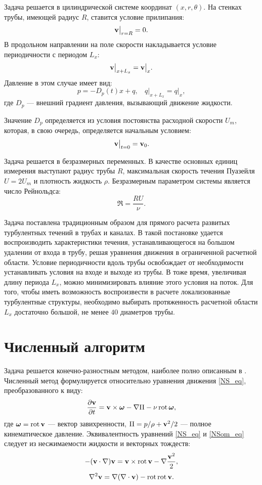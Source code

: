 Задача решается в цилиндрической системе координат $(x,r,\theta)$. На стенках трубы, имеющей радиус $R$, ставится условие прилипания:
\begin{equation} \label{bc1_eq}
\mathbf{v} \big|_{r=R} = 0.
\end{equation}
В продольном направлении на поле скорости накладывается условие периодичности с периодом $L_x$:
\begin{equation} \label{bc2_eq}
\mathbf{v} \big|_{x+L_x} = \mathbf{v} \big|_{x}.
\end{equation}
Давление в этом случае имеет вид:
$$
p = - D_p(t)x + q, \ \ \ \  q\big|_{x+L_x} = q\big|_{x},
$$
где $D_p$ --- внешний градиент давления, вызывающий движение жидкости. 

Значение $D_p$ определяется из условия постоянства расходной скорости $U_m$, которая, в свою очередь, определяется начальным условием:
$$
\mathbf{v}\big|_{t=0} = \mathbf{v}_0.
$$

 
Задача решается в безразмерных переменных. В качестве основных единиц измерения выступают радиус трубы $R$, максимальная скорость течения Пуазейля $U = 2U_m$ и плотность жидкость $\rho$. Безразмерным параметром системы является число Рейнольдса:
$$
\Re = \frac{R U}{\nu}. 
$$

Задача поставлена традиционным образом для прямого расчета развитых турбулентных течений в трубах и каналах. В такой постановке удается воспроизводить характеристики течения, устанавливающегося на большом удалении от входа в трубу, решая уравнения движения в ограниченной расчетной области. Условие периодичности вдоль трубы освобождает от необходимости устанавливать условия на входе и выходе из трубы. В тоже время, увеличивая длину периода $L_x$, можно минимизировать влияние этого условия на поток. Для того, чтобы иметь возможность воспроизвести в расчете локализованные турбулентные структуры, необходимо выбирать протяженность расчетной области $L_x$ достаточно большой, не менее $40$ диаметров трубы. 

\section{Численный алгоритм} \label{num_method}

Задача решается конечно-разностным методом, наиболее полно описанным в \cite{Nikitin2006}. Численный метод формулируется относительно уравнения движения \eqref{NS_eq}, преобразованного к	 виду:
\begin{equation}\label{NSom_eq}
\frac{\partial \mathbf{v}}{\partial t} =  \mathbf{v} \times \mbox{\boldmath$\omega$}  - \nabla \Pi - \nu \mathop{}\!\operatorname{rot} \mbox{\boldmath$\omega$},
\end{equation}
где $\mbox{\boldmath$\omega$} = \mathop{}\!\operatorname{rot} \mathbf{v}$ --- вектор завихренности, $\Pi = p/\rho + \mathbf{v}^2/2$ --- полное кинематическое давление. Эквивалентность уравнений \eqref{NS_eq} и \eqref{NSom_eq} следует из несжимаемости жидкости и векторных тождеств:
\begin{equation*}
-(\mathbf{v} \cdot \nabla) \mathbf{v} = \mathbf{v} \times \mathop{}\!\operatorname{rot} \mathbf{v} - \nabla \frac{\mathbf{v}^2}{2},
\end{equation*}
\begin{equation*}
\nabla^2 \mathbf{v} = \nabla (\nabla \cdot \mathbf{v}) - \mathop{}\!\operatorname{rot} \mathop{}\!\operatorname{rot} \mathbf{v}.
\end{equation*}

